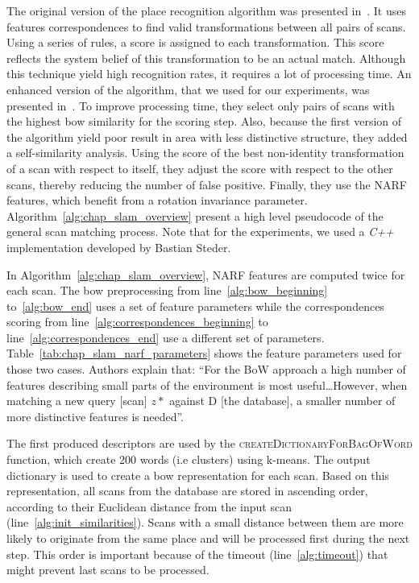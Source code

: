 The original version of the place recognition algorithm was presented in~\cite{Steder2010}. It uses features correspondences to find valid transformations between all pairs of scans. Using a series of rules, a score is assigned to each transformation. This score reflects the system belief of this transformation to be an actual match. Although this technique yield high recognition rates, it requires a lot of processing time. An enhanced version of the algorithm, that we used for our experiments, was presented in~\cite{Steder2011b}. To improve processing time, they select only pairs of scans with the highest \gls*{bow} similarity for the scoring step. Also, because the first version of the algorithm yield poor result in area with less distinctive structure, they added a self-similarity analysis. Using the score of the best non-identity transformation of a scan with respect to itself, they adjust the score with respect to the other scans, thereby reducing the number of false positive. Finally, they use the NARF features, which benefit from a rotation invariance parameter. Algorithm~\ref{alg:chap_slam_overview} present a high level pseudocode of the general scan matching process. Note that for the experiments, we used a \textit{C++} implementation developed by Bastian Steder.

In Algorithm~\ref{alg:chap_slam_overview}, NARF features are computed twice for each scan. The \gls*{bow} preprocessing from line~\ref{alg:bow_beginning} to~\ref{alg:bow_end} uses a set of feature parameters while the correspondences scoring from line~\ref{alg:correspondences_beginning} to line~\ref{alg:correspondences_end} use a different set of parameters. Table~\ref{tab:chap_slam_narf_parameters} shows the feature parameters used for those two cases. Authors explain that: \enquote{For the BoW approach a high number of features describing small parts of the environment is most useful\dots However, when matching a new query [scan] $z*$ against D [the database], a smaller number of more distinctive features is needed}.

The first produced descriptors are used by the \textsc{createDictionaryForBagOfWord} function, which create 200 words (i.e clusters) using k-means. The output dictionary is used to create a \gls*{bow} representation for each scan. Based on this representation, all scans from the database are stored in ascending order, according to their Euclidean distance from the input scan (line~\ref{alg:init_similarities}). Scans with a small distance between them are more likely to originate from the same place and will be processed first during the next step. This order is important because of the timeout (line~\ref{alg:timeout}) that might prevent last scans to be processed.


